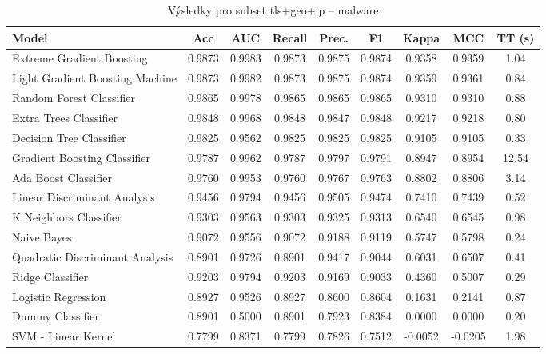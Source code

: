 \begin{table}[H]
  \centering
  \small
  \caption{Výsledky pro subset tls+geo+ip – malware}
  \begin{tabular}{|l|c|c|c|c|c|c|c|c|}
    \hline
    \textbf{Model} & \textbf{Acc} & \textbf{AUC} & \textbf{Recall} & \textbf{Prec.} & \textbf{F1} & \textbf{Kappa} & \textbf{MCC} & \textbf{TT (s)} \\
    \hline
    Extreme Gradient Boosting & 0.9873 & 0.9983 & 0.9873 & 0.9875 & 0.9874 & 0.9358 & 0.9359 & 1.04 \\
    Light Gradient Boosting Machine & 0.9873 & 0.9982 & 0.9873 & 0.9875 & 0.9874 & 0.9359 & 0.9361 & 0.84 \\
    Random Forest Classifier & 0.9865 & 0.9978 & 0.9865 & 0.9865 & 0.9865 & 0.9310 & 0.9310 & 0.88 \\
    Extra Trees Classifier & 0.9848 & 0.9968 & 0.9848 & 0.9847 & 0.9848 & 0.9217 & 0.9218 & 0.80 \\
    Decision Tree Classifier & 0.9825 & 0.9562 & 0.9825 & 0.9825 & 0.9825 & 0.9105 & 0.9105 & 0.33 \\
    Gradient Boosting Classifier & 0.9787 & 0.9962 & 0.9787 & 0.9797 & 0.9791 & 0.8947 & 0.8954 & 12.54 \\
    Ada Boost Classifier & 0.9760 & 0.9953 & 0.9760 & 0.9767 & 0.9763 & 0.8802 & 0.8806 & 3.14 \\
    Linear Discriminant Analysis & 0.9456 & 0.9794 & 0.9456 & 0.9505 & 0.9474 & 0.7410 & 0.7439 & 0.52 \\
    K Neighbors Classifier & 0.9303 & 0.9563 & 0.9303 & 0.9325 & 0.9313 & 0.6540 & 0.6545 & 0.98 \\
    Naive Bayes & 0.9072 & 0.9556 & 0.9072 & 0.9188 & 0.9119 & 0.5747 & 0.5798 & 0.24 \\
    Quadratic Discriminant Analysis & 0.8901 & 0.9726 & 0.8901 & 0.9417 & 0.9044 & 0.6031 & 0.6507 & 0.41 \\
    Ridge Classifier & 0.9203 & 0.9794 & 0.9203 & 0.9169 & 0.9033 & 0.4360 & 0.5007 & 0.29 \\
    Logistic Regression & 0.8927 & 0.9526 & 0.8927 & 0.8600 & 0.8604 & 0.1631 & 0.2141 & 0.87 \\
    Dummy Classifier & 0.8901 & 0.5000 & 0.8901 & 0.7923 & 0.8384 & 0.0000 & 0.0000 & 0.20 \\
    SVM - Linear Kernel & 0.7799 & 0.8371 & 0.7799 & 0.7826 & 0.7512 & -0.0052 & -0.0205 & 1.98 \\
    \hline
  \end{tabular}
\end{table}
\vspace{0.5cm}

